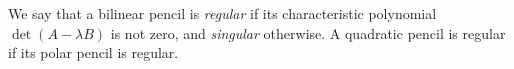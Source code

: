 \documentclass{lms}
\def\chk#1{#1^{\smash{\scalebox{.7}[1.4]{\rotatebox{90}{\guilsinglleft}}}}}
\DeclareMathOperator\PGL{PGL}
\begin{document}
We say that a bilinear pencil is \emph{regular}
if its characteristic polynomial~$\det (A - λ B)$ is not zero,
and \emph{singular} otherwise.
A quadratic pencil is regular if its polar pencil is regular.


% 
% 
\end{document}
